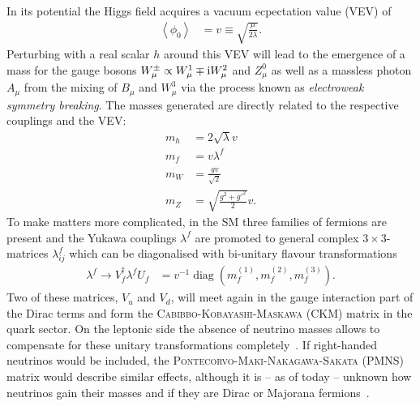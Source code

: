 \noindent In its potential the Higgs field acquires a vacuum ecpectation value (VEV) of
\begin{align}
\left\langle\phi_0\right\rangle&=v\equiv\sqrt{\frac\mu{2\lambda}}.
\end{align}
Perturbing with a real scalar $h$ around this VEV will lead to the emergence of a mass for the gauge bosons \mbox{$W^\pm_\mu\propto W^1_\mu\mp\mathrm{i} W^2_\mu$} and $Z^0_\mu$ as well as a massless photon $A_\mu$ from the mixing of $B_\mu$ and $W^3_\mu$ via the process known as \textit{electroweak symmetry breaking}.
The masses generated are directly related to the respective couplings and the VEV:
\begin{align}
m_h&=2\sqrt{\lambda}v\\
m_f&=v\lambda^f\\
m_W&=\frac{gv}{\sqrt{2}}\\
m_Z&=\sqrt{\frac{g^2+{g'}^2}2}v.
\end{align}
To make matters more complicated, in the SM three families of fermions are present and the Yukawa couplings $\lambda^f$ are promoted to general complex \mbox{$3\!\times\!3$}- matrices $\lambda^f_{ij}$ which can be diagonalised with bi-unitary flavour transformations
\begin{align}
\lambda^f\to V_f^\dagger\lambda^fU_f&=v^{-1}\operatorname{diag}\left(m^{(1)}_f, m^{(2)}_f, m^{(3)}_f\right).
\end{align}
Two of these matrices, $V_u$ and $V_d$, will meet again in the gauge interaction part of the Dirac terms and form the \textsc{Cabibbo-Kobayashi-Maskawa} (CKM) matrix in the quark sector.
On the leptonic side the absence of neutrino masses allows to compensate for these unitary transformations completely~\cite{arthur, pdg}. If right-handed neutrinos would be included, the \textsc{Pontecorvo-Maki-Nakagawa-Sakata} (PMNS) matrix would describe similar effects, although it is – as of today – unknown how neutrinos gain their masses and if they are Dirac or Majorana fermions~\cite{pdg}.

